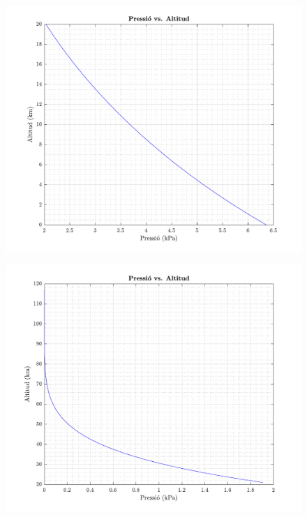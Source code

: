 \begin{figure}[ht]
\begin{minipage}{.5\textwidth}
        \label{fig:12mars}
    \end{minipage}
    \begin{minipage}{.5\textwidth}
        \centering
        \includegraphics[width=1\linewidth]{imagenes/11_mars/pressio_0_20.pdf}
        \label{fig:13mars}
    \end{minipage}%
        \begin{minipage}{.5\textwidth}
        \centering
        \includegraphics[width=1\linewidth]{imagenes/11_mars/pressio_20_120.pdf}
        \label{fig:14mars}
    \end{minipage}
\end{figure}

